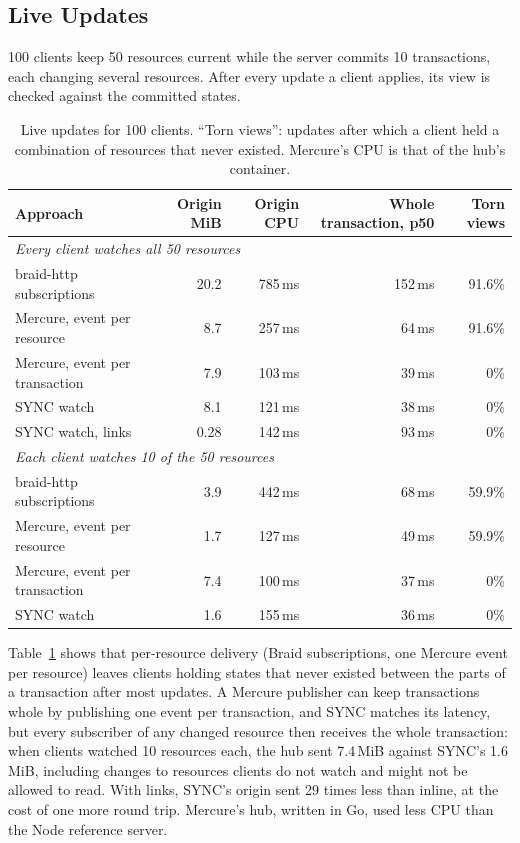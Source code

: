 \documentclass[11pt,a4paper]{article}
\begin{document}
\subsection{Live Updates}

100 clients keep 50 resources current while the server commits 10 transactions, each changing several resources. After every update a client applies, its view is checked against the committed states.

\begin{table}[h]
\centering
\footnotesize
\setlength{\tabcolsep}{4pt}
\begin{tabular}{lrrrr}
\toprule
\textbf{Approach} & \textbf{Origin MiB} & \textbf{Origin CPU} & \textbf{Whole transaction, p50} & \textbf{Torn views} \\
\midrule
\multicolumn{5}{l}{\emph{Every client watches all 50 resources}} \\
braid-http subscriptions & 20.2 & 785\,ms & 152\,ms & 91.6\% \\
Mercure, event per resource & 8.7 & 257\,ms & 64\,ms & 91.6\% \\
Mercure, event per transaction & 7.9 & 103\,ms & 39\,ms & 0\% \\
SYNC watch & 8.1 & 121\,ms & 38\,ms & 0\% \\
SYNC watch, links & 0.28 & 142\,ms & 93\,ms & 0\% \\
\midrule
\multicolumn{5}{l}{\emph{Each client watches 10 of the 50 resources}} \\
braid-http subscriptions & 3.9 & 442\,ms & 68\,ms & 59.9\% \\
Mercure, event per resource & 1.7 & 127\,ms & 49\,ms & 59.9\% \\
Mercure, event per transaction & 7.4 & 100\,ms & 37\,ms & 0\% \\
SYNC watch & 1.6 & 155\,ms & 36\,ms & 0\% \\
\bottomrule
\end{tabular}
\caption{Live updates for 100 clients. ``Torn views'': updates after which a client held a combination of resources that never existed. Mercure's CPU is that of the hub's container.}
\label{tab:live}
\end{table}

Table~\ref{tab:live} shows that per-resource delivery (Braid subscriptions, one Mercure event per resource) leaves clients holding states that never existed between the parts of a transaction after most updates. A Mercure publisher can keep transactions whole by publishing one event per transaction, and SYNC matches its latency, but every subscriber of any changed resource then receives the whole transaction: when clients watched 10 resources each, the hub sent 7.4\,MiB against SYNC's 1.6\,MiB, including changes to resources clients do not watch and might not be allowed to read. With links, SYNC's origin sent 29 times less than inline, at the cost of one more round trip. Mercure's hub, written in Go, used less CPU than the Node reference server.
\end{document}
